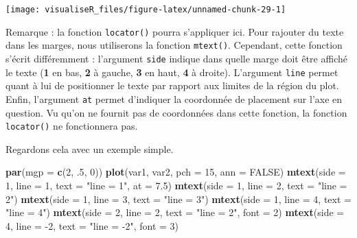 \documentclass[]{article}
\newenvironment{Shaded}{\begin{snugshade}}{\end{snugshade}}
\newcommand{\DataTypeTok}[1]{\textcolor[rgb]{0.13,0.29,0.53}{#1}}
\newcommand{\DecValTok}[1]{\textcolor[rgb]{0.00,0.00,0.81}{#1}}
\newcommand{\FloatTok}[1]{\textcolor[rgb]{0.00,0.00,0.81}{#1}}
\newcommand{\KeywordTok}[1]{\textcolor[rgb]{0.13,0.29,0.53}{\textbf{#1}}}
\newcommand{\NormalTok}[1]{#1}
\newcommand{\OtherTok}[1]{\textcolor[rgb]{0.56,0.35,0.01}{#1}}
\newcommand{\StringTok}[1]{\textcolor[rgb]{0.31,0.60,0.02}{#1}}
\begin{document}
\begin{center}\texttt{[image: visualiseR\_files/figure-latex/unnamed-chunk-29-1]} \end{center}

Remarque : la fonction \texttt{locator()} pourra s'appliquer ici.
Pour rajouter du texte dans les marges, nous utiliserons la fonction \texttt{mtext()}. Cependant, cette fonction s'écrit différemment : l'argument \texttt{side} indique dans quelle marge doit être affiché le texte (\textbf{1} en bas, \textbf{2} à gauche, \textbf{3} en haut, \textbf{4} à droite). L'argument \texttt{line} permet quant à lui de positionner le texte par rapport aux limites de la région du plot. Enfin, l'argument \texttt{at} permet d'indiquer la coordonnée de placement sur l'axe en question.
Vu qu'on ne fournit pas de coordonnées dans cette fonction, la fonction \texttt{locator()} ne fonctionnera pas.

Regardons cela avec un exemple simple.

\begin{Shaded}
\begin{Highlighting}[]
\KeywordTok{par}\NormalTok{(}\DataTypeTok{mgp =} \KeywordTok{c}\NormalTok{(}\DecValTok{2}\NormalTok{, }\FloatTok{.5}\NormalTok{, }\DecValTok{0}\NormalTok{))}
\KeywordTok{plot}\NormalTok{(var1, var2, }\DataTypeTok{pch =} \DecValTok{15}\NormalTok{, }\DataTypeTok{ann =} \OtherTok{FALSE}\NormalTok{)}
\KeywordTok{mtext}\NormalTok{(}\DataTypeTok{side =} \DecValTok{1}\NormalTok{, }\DataTypeTok{line =} \DecValTok{1}\NormalTok{, }\DataTypeTok{text =} \StringTok{"line = 1"}\NormalTok{, }\DataTypeTok{at =} \FloatTok{7.5}\NormalTok{)}
\KeywordTok{mtext}\NormalTok{(}\DataTypeTok{side =} \DecValTok{1}\NormalTok{, }\DataTypeTok{line =} \DecValTok{2}\NormalTok{, }\DataTypeTok{text =} \StringTok{"line = 2"}\NormalTok{)}
\KeywordTok{mtext}\NormalTok{(}\DataTypeTok{side =} \DecValTok{1}\NormalTok{, }\DataTypeTok{line =} \DecValTok{3}\NormalTok{, }\DataTypeTok{text =} \StringTok{"line = 3"}\NormalTok{)}
\KeywordTok{mtext}\NormalTok{(}\DataTypeTok{side =} \DecValTok{1}\NormalTok{, }\DataTypeTok{line =} \DecValTok{4}\NormalTok{, }\DataTypeTok{text =} \StringTok{"line = 4"}\NormalTok{)}
\KeywordTok{mtext}\NormalTok{(}\DataTypeTok{side =} \DecValTok{2}\NormalTok{, }\DataTypeTok{line =} \DecValTok{2}\NormalTok{, }\DataTypeTok{text =} \StringTok{"line = 2"}\NormalTok{, }\DataTypeTok{font =} \DecValTok{2}\NormalTok{)}
\KeywordTok{mtext}\NormalTok{(}\DataTypeTok{side =} \DecValTok{4}\NormalTok{, }\DataTypeTok{line =} \DecValTok{-2}\NormalTok{, }\DataTypeTok{text =} \StringTok{"line = -2"}\NormalTok{, }\DataTypeTok{font =} \DecValTok{3}\NormalTok{)}
\end{Highlighting}
\end{Shaded}
\end{document}
